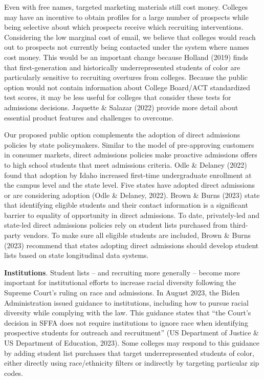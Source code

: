 \documentclass[
  12pt,
]{article}
\begin{document}
Even with free names, targeted marketing materials still cost money. Colleges may have an incentive to obtain profiles for a large number of prospects while being selective about which prospects receive which recruiting interventions. Considering the low marginal cost of email, we believe that colleges would reach out to prospects not currently being contacted under the system where names cost money. This would be an important change because Holland (2019) finds that first-generation and historically underrepresented students of color are particularly sensitive to recruiting overtures from colleges. Because the public option would not contain information about College Board/ACT standardized test scores, it may be less useful for colleges that consider these tests for admissions decisions. Jaquette \& Salazar (2022) provide more detail about essential product features and challenges to overcome.

Our proposed public option complements the adoption of direct admissions policies by state policymakers. Similar to the model of pre-approving customers in consumer markets, direct admissions policies make proactive admissions offers to high school students that meet admissions criteria. Odle \& Delaney (2022) found that adoption by Idaho increased first-time undergraduate enrollment at the campus level and the state level. Five states have adopted direct admissions or are considering adoption (Odle \& Delaney, 2022). Brown \& Burns (2023) state that identifying eligible students and their contact information is a significant barrier to equality of opportunity in direct admissions. To date, privately-led and state-led direct admissions policies rely on student lists purchased from third-party vendors. To make sure all eligible students are included, Brown \& Burns (2023) recommend that states adopting direct admissions should develop student lists based on state longitudinal data systems.

\textbf{Institutions}. Student lists -- and recruiting more generally -- become more important for institutional efforts to increase racial diversity following the Supreme Court's ruling on race and admissions. In August 2023, the Biden Administration issued guidance to institutions, including how to pursue racial diversity while complying with the law. This guidance states that ``the Court's decision in SFFA does not require institutions to ignore race when identifying prospective students for outreach and recruitment'' (US Department of Justice \& US Department of Education, 2023). Some colleges may respond to this guidance by adding student list purchases that target underrepresented students of color, either directly using race/ethnicity filters or indirectly by targeting particular zip codes.
\end{document}

